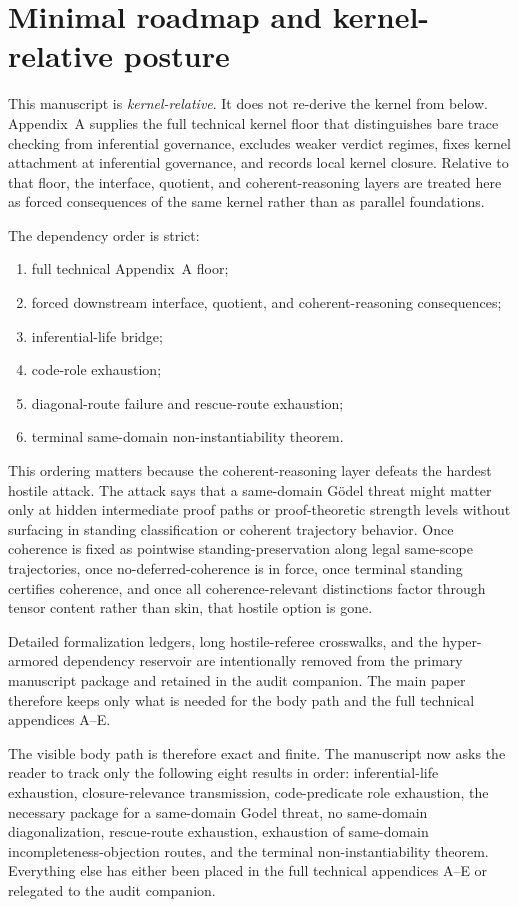 \section{Minimal roadmap and kernel-relative posture}

This manuscript is \emph{kernel-relative}. It does not re-derive the kernel from below. Appendix~A supplies the full technical kernel floor that distinguishes bare trace checking from inferential governance, excludes weaker verdict regimes, fixes kernel attachment at inferential governance, and records local kernel closure. Relative to that floor, the interface, quotient, and coherent-reasoning layers are treated here as forced consequences of the same kernel rather than as parallel foundations.

The dependency order is strict:
\begin{enumerate}[leftmargin=2.5em]
  \item full technical Appendix~A floor;
  \item forced downstream interface, quotient, and coherent-reasoning consequences;
  \item inferential-life bridge;
  \item code-role exhaustion;
  \item diagonal-route failure and rescue-route exhaustion;
  \item terminal same-domain non-instantiability theorem.
\end{enumerate}

This ordering matters because the coherent-reasoning layer defeats the hardest hostile attack. The attack says that a same-domain G\"odel threat might matter only at hidden intermediate proof paths or proof-theoretic strength levels without surfacing in standing classification or coherent trajectory behavior. Once coherence is fixed as pointwise standing-preservation along legal same-scope trajectories, once no-deferred-coherence is in force, once terminal standing certifies coherence, and once all coherence-relevant distinctions factor through tensor content rather than skin, that hostile option is gone.


Detailed formalization ledgers, long hostile-referee crosswalks, and the hyper-armored dependency reservoir are intentionally removed from the primary manuscript package and retained in the audit companion. The main paper therefore keeps only what is needed for the body path and the full technical appendices A--E.

The visible body path is therefore exact and finite. The manuscript now asks the reader to track only the following eight results in order: inferential-life exhaustion, closure-relevance transmission, code-predicate role exhaustion, the necessary package for a same-domain Godel threat, no same-domain diagonalization, rescue-route exhaustion, exhaustion of same-domain incompleteness-objection routes, and the terminal non-instantiability theorem. Everything else has either been placed in the full technical appendices A--E or relegated to the audit companion.
